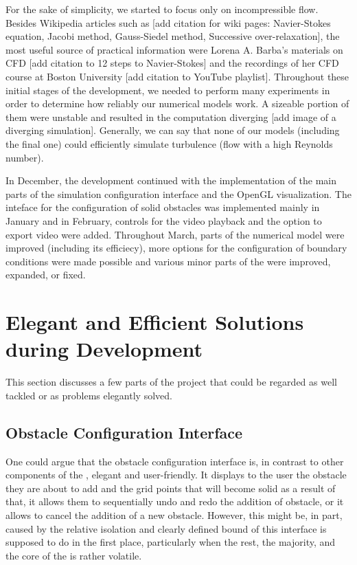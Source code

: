 \documentclass[11pt,a4paper,twoside,openright]{report}
\begin{document}
For the sake of simplicity, we started to focus only on incompressible flow. Besides Wikipedia articles such as [add citation for wiki pages: Navier-Stokes equation, Jacobi method, Gauss-Siedel method, Successive over-relaxation], the most useful source of practical information were Lorena A. Barba's materials on CFD [add citation to 12 steps to Navier-Stokes] and the recordings of her CFD course at Boston University [add citation to YouTube playlist]. Throughout these initial stages of the development, we needed to perform many experiments in order to determine how reliably our numerical models work. A sizeable portion of them were unstable and resulted in the computation diverging [add image of a diverging simulation]. Generally, we can say that none of our models (including the final one) could efficiently simulate turbulence (flow with a high Reynolds number).

In December, the development continued with the implementation of the main parts of the simulation configuration interface and the OpenGL visualization. The inteface for the configuration of solid obstacles was implemented mainly in January and in February, controls for the video playback and the option to export video were added. Throughout March, parts of the numerical model were improved (including its efficiecy), more options for the configuration of boundary conditions were made possible and various minor parts of the \software{} were improved, expanded, or fixed.

\section{Elegant and Efficient Solutions during Development}
This section discusses a few parts of the project that could be regarded as well tackled or as problems elegantly solved.

\subsection{Obstacle Configuration Interface}
One could argue that the obstacle configuration interface is, in contrast to other components of the \software{}, elegant and user-friendly. It displays to the user the obstacle they are about to add and the grid points that will become solid as a result of that, it allows them to sequentially undo and redo the addition of obstacle, or it allows to cancel the addition of a new obstacle. However, this might be, in part, caused by the relative isolation and clearly defined bound of this interface is supposed to do in the first place, particularly when the rest, the majority, and the core of the \software{} is rather volatile.
\end{document}
